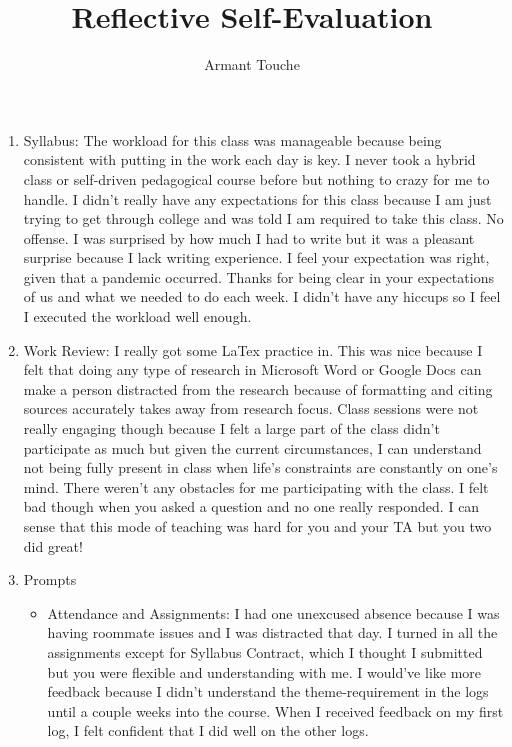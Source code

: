 \documentclass{article}
\begin{document}
\title{\vspace{-2cm}Reflective Self-Evaluation}
\author{Armant Touche}
\maketitle

\begin{enumerate}

    \item Syllabus: The workload for this class was manageable because being consistent with putting in the work each day is key. I never took a hybrid class or self-driven pedagogical course before but nothing to crazy for me to handle. I didn't really have any expectations for this class because I am just trying to get through college and was told I am required to take this class. No offense. I was surprised by how much I had to write but it was a pleasant surprise because I lack writing experience. I feel your expectation was right, given that a pandemic occurred. Thanks for being clear in your expectations of us and what we needed to do each week. I didn't have any hiccups so I feel I executed the workload well enough.

    \item Work Review: I really got some LaTex practice in. This was nice because I felt that doing any type of research in Microsoft Word or Google Docs can make a person distracted from the research because of formatting and citing sources accurately takes away from research focus. Class sessions were not really engaging though because I felt a large part of the class didn't participate as much but given the current circumstances, I can understand not being fully present in class when life's constraints are constantly on one's mind. There weren't any obstacles for me participating with the class. I felt bad though when you asked a question and no one really responded. I can sense that this mode of teaching was hard for you and your TA but you two did great! 

    \item Prompts
    
    \begin{itemize}

        \item Attendance and Assignments: I had one unexcused absence because I was having roommate issues and I was distracted that day. I turned in all the assignments except for Syllabus Contract, which I thought I submitted but you were flexible and understanding with me. I would've like more feedback because I didn't understand the theme-requirement in the logs until a couple weeks into the course. When I received feedback on my first log, I felt confident that I did well on the other logs.


\end{itemize}
\end{enumerate}
\end{document}
